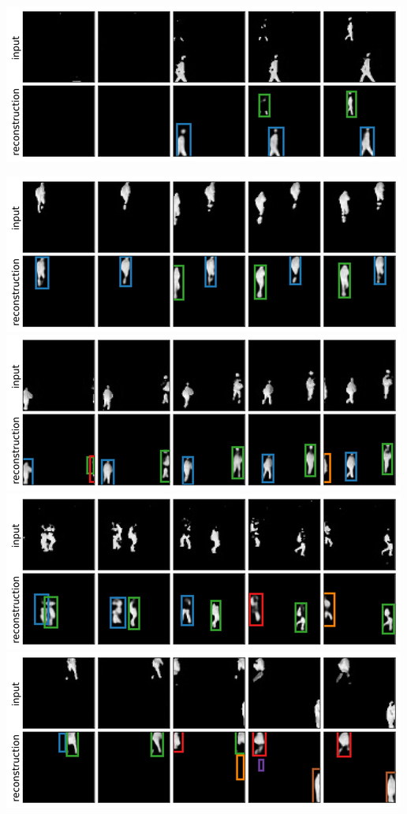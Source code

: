 \begin{center}
\begin{minipage}[c]{0.49\linewidth}
        \includegraphics[width=\linewidth]{figures/SQAIR/duke_rec/000085.png}
    \end{minipage}
    \hfill
    \begin{minipage}[c]{0.49\linewidth}
        \centering
        \includegraphics[width=\linewidth]{figures/SQAIR/duke_rec/000088.png}
        \includegraphics[width=\linewidth]{figures/SQAIR/duke_rec/000046.png}
        \includegraphics[width=\linewidth]{figures/SQAIR/duke_rec/000094.png}
        \includegraphics[width=\linewidth]{figures/SQAIR/duke_rec/000096.png}

\end{minipage}
\end{center}
